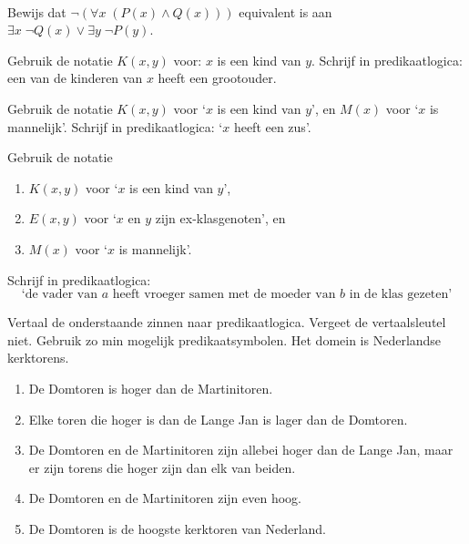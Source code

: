 \begin{exercise}\mbox{}\\
Bewijs dat $\neg(\forall x\;(P(x)\land Q(x)))$ equivalent is aan $\exists x\;\neg Q(x)\lor\exists y\;\neg P(y)$.
\end{exercise}

\begin{exercise}
Gebruik de notatie $K(x,y)$ voor: $x$ is een kind van $y$. Schrijf in predikaatlogica: een van de kinderen van $x$ heeft een grootouder.
\end{exercise}

\begin{exercise}
Gebruik de notatie $K(x,y)$ voor `$x$ is een kind van $y$', en $M(x)$ voor `$x$ is mannelijk'. Schrijf in predikaatlogica: `$x$ heeft een zus'.
\end{exercise}

\begin{exercise}
Gebruik de notatie
\begin{enumerate}
    \item $K(x,y)$ voor `$x$ is een kind van $y$',
    \item $E(x,y)$ voor `$x$ en $y$ zijn ex-klasgenoten', en
    \item $M(x)$ voor `$x$ is mannelijk'.
\end{enumerate}
Schrijf in predikaatlogica:
$$\text{`de vader van $a$ heeft vroeger samen met de moeder van $b$ in de klas gezeten'}$$
\end{exercise}

\begin{exercise}
Vertaal de onderstaande zinnen naar predikaatlogica. Vergeet de vertaalsleutel niet. Gebruik zo min mogelijk predikaatsymbolen.
Het domein is Nederlandse kerktorens.
\begin{enumerate}
\item De Domtoren is hoger dan de Martinitoren.
\item Elke toren die hoger is dan de Lange Jan is lager dan de Domtoren.
\item De Domtoren en de Martinitoren zijn allebei hoger dan de Lange Jan, maar er zijn torens die hoger zijn dan elk van beiden.
\item De Domtoren en de Martinitoren zijn even hoog.
\item De Domtoren is de hoogste kerktoren van Nederland.
\end{enumerate}
\end{exercise}

